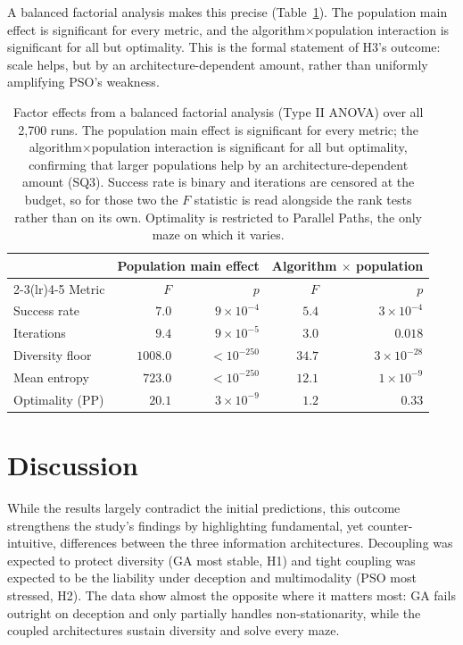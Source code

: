 \documentclass[11pt,a4paper]{article}
\begin{document}
    A balanced factorial analysis makes this precise (Table~\ref{tab:factoreffects}). The population main effect is significant for every metric, and the algorithm$\times$population interaction is significant for all but optimality. This is the formal statement of H3's outcome: scale helps, but by an architecture-dependent amount, rather than uniformly amplifying PSO's weakness.

    \begin{table}[ht]
        \centering
        \small
        \begin{tabular}{lrrrr}
            \toprule
            & \multicolumn{2}{c}{Population main effect} & \multicolumn{2}{c}{Algorithm $\times$ population} \\
            \cmidrule(lr){2-3}\cmidrule(lr){4-5}
            Metric & $F$ & $p$ & $F$ & $p$ \\
            \midrule
            Success rate      & $7.0$    & $9\times10^{-4}$  & $5.4$  & $3\times10^{-4}$ \\
            Iterations        & $9.4$    & $9\times10^{-5}$  & $3.0$  & $0.018$ \\
            Diversity floor   & $1008.0$ & $<10^{-250}$      & $34.7$ & $3\times10^{-28}$ \\
            Mean entropy      & $723.0$  & $<10^{-250}$      & $12.1$ & $1\times10^{-9}$ \\
            Optimality (PP)   & $20.1$   & $3\times10^{-9}$  & $1.2$  & $0.33$ \\
            \bottomrule
        \end{tabular}
        \caption{Factor effects from a balanced factorial analysis (Type II ANOVA) over all 2{,}700 runs. The population main effect is significant for every metric; the algorithm$\times$population interaction is significant for all but optimality, confirming that larger populations help by an architecture-dependent amount (SQ3). Success rate is binary and iterations are censored at the budget, so for those two the $F$ statistic is read alongside the rank tests rather than on its own. Optimality is restricted to Parallel Paths, the only maze on which it varies.}
        \label{tab:factoreffects}
    \end{table}

    \section{Discussion}
    While the results largely contradict the initial predictions, this outcome strengthens the study’s findings by highlighting fundamental, yet counter-intuitive, differences between the three information architectures. Decoupling was expected to protect diversity (GA most stable, H1) and tight coupling was expected to be the liability under deception and multimodality (PSO most stressed, H2). The data show almost the opposite where it matters most: GA fails outright on deception and only partially handles non-stationarity, while the coupled architectures sustain diversity and solve every maze.
\end{document}
